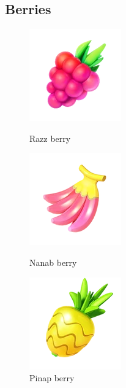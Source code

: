 \subsection{Berries}
\label{sec:berries}
\begin{figure}[h!]
  \begin{minipage}[t]{0.3\textwidth}
    \begin{center}
    \includegraphics[scale=.4]{images/razz.png}
    \end{center}
    \caption*{Razz berry}
    \label{fig:razz}
  \end{minipage}
  \begin{minipage}[t]{0.3\textwidth}
    \begin{center}
    \includegraphics[scale=.4]{images/nanab.png}
    \end{center}
    \caption*{Nanab berry}
    \label{fig:nanab}
  \end{minipage}
  \begin{minipage}[t]{0.3\textwidth}
    \begin{center}
    \includegraphics[scale=.4]{images/pinap.png}
    \end{center}
    \caption*{Pinap berry}
    \label{fig:pinap}
  \end{minipage}
\end{figure}
